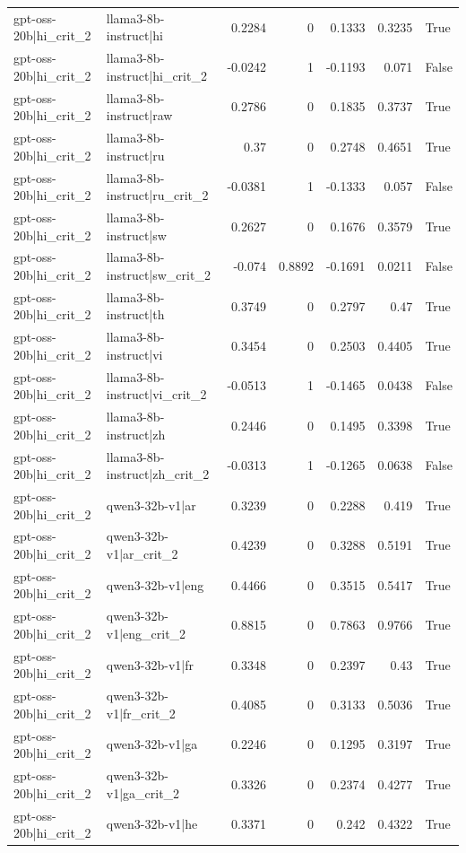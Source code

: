 \begin{table}
\begin{tabular}{l l r r r r l}
gpt-oss-20b|hi_crit_2 & llama3-8b-instruct|hi & 0.2284 & 0 & 0.1333 & 0.3235 & True \\
gpt-oss-20b|hi_crit_2 & llama3-8b-instruct|hi_crit_2 & -0.0242 & 1 & -0.1193 & 0.071 & False \\
gpt-oss-20b|hi_crit_2 & llama3-8b-instruct|raw & 0.2786 & 0 & 0.1835 & 0.3737 & True \\
gpt-oss-20b|hi_crit_2 & llama3-8b-instruct|ru & 0.37 & 0 & 0.2748 & 0.4651 & True \\
gpt-oss-20b|hi_crit_2 & llama3-8b-instruct|ru_crit_2 & -0.0381 & 1 & -0.1333 & 0.057 & False \\
gpt-oss-20b|hi_crit_2 & llama3-8b-instruct|sw & 0.2627 & 0 & 0.1676 & 0.3579 & True \\
gpt-oss-20b|hi_crit_2 & llama3-8b-instruct|sw_crit_2 & -0.074 & 0.8892 & -0.1691 & 0.0211 & False \\
gpt-oss-20b|hi_crit_2 & llama3-8b-instruct|th & 0.3749 & 0 & 0.2797 & 0.47 & True \\
gpt-oss-20b|hi_crit_2 & llama3-8b-instruct|vi & 0.3454 & 0 & 0.2503 & 0.4405 & True \\
gpt-oss-20b|hi_crit_2 & llama3-8b-instruct|vi_crit_2 & -0.0513 & 1 & -0.1465 & 0.0438 & False \\
gpt-oss-20b|hi_crit_2 & llama3-8b-instruct|zh & 0.2446 & 0 & 0.1495 & 0.3398 & True \\
gpt-oss-20b|hi_crit_2 & llama3-8b-instruct|zh_crit_2 & -0.0313 & 1 & -0.1265 & 0.0638 & False \\
gpt-oss-20b|hi_crit_2 & qwen3-32b-v1|ar & 0.3239 & 0 & 0.2288 & 0.419 & True \\
gpt-oss-20b|hi_crit_2 & qwen3-32b-v1|ar_crit_2 & 0.4239 & 0 & 0.3288 & 0.5191 & True \\
gpt-oss-20b|hi_crit_2 & qwen3-32b-v1|eng & 0.4466 & 0 & 0.3515 & 0.5417 & True \\
gpt-oss-20b|hi_crit_2 & qwen3-32b-v1|eng_crit_2 & 0.8815 & 0 & 0.7863 & 0.9766 & True \\
gpt-oss-20b|hi_crit_2 & qwen3-32b-v1|fr & 0.3348 & 0 & 0.2397 & 0.43 & True \\
gpt-oss-20b|hi_crit_2 & qwen3-32b-v1|fr_crit_2 & 0.4085 & 0 & 0.3133 & 0.5036 & True \\
gpt-oss-20b|hi_crit_2 & qwen3-32b-v1|ga & 0.2246 & 0 & 0.1295 & 0.3197 & True \\
gpt-oss-20b|hi_crit_2 & qwen3-32b-v1|ga_crit_2 & 0.3326 & 0 & 0.2374 & 0.4277 & True \\
gpt-oss-20b|hi_crit_2 & qwen3-32b-v1|he & 0.3371 & 0 & 0.242 & 0.4322 & True \\

\end{tabular}
\end{table}
